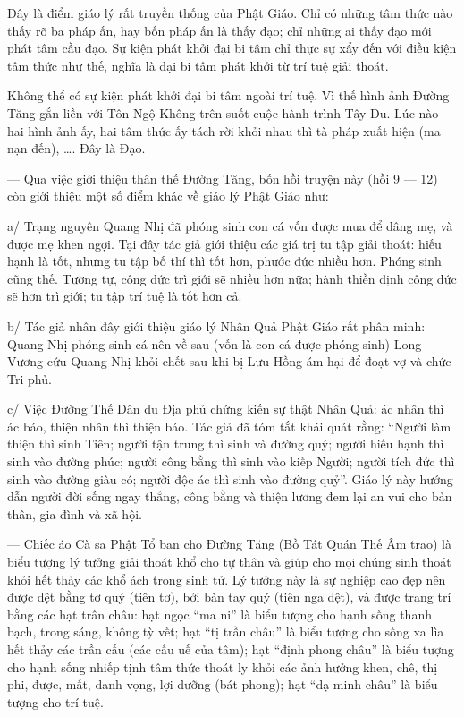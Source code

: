Đây là điểm giáo lý rất truyền thống của Phật Giáo. Chỉ có những tâm thức nào thấy rõ ba pháp ấn, hay bốn pháp ấn là thấy đạo; chỉ những ai thấy đạo mới phát tâm cầu đạo. Sự kiện phát khởi đại bi tâm chỉ thực sự xẩy đến với điều kiện tâm thức như thế, nghĩa là đại bi tâm phát khởi từ trí tuệ giải thoát.

Không thể có sự kiện phát khởi đại bi tâm ngoài trí tuệ. Vì thế hình ảnh Đường Tăng gắn liền với Tôn Ngộ Không trên suốt cuộc hành trình Tây Du. Lúc nào hai hình ảnh ấy, hai tâm thức ấy tách rời khỏi nhau thì tà pháp xuất hiện (ma nạn đến), \ldots. Đây là Đạo.

— Qua việc giới thiệu thân thế Đường Tăng, bốn hồi truyện này (hồi 9 — 12) còn giới thiệu một số điểm khác về giáo lý Phật Giáo như:

a/ Trạng nguyên Quang Nhị đã phóng sinh con cá vốn được mua để dâng mẹ, và được mẹ khen ngợi. Tại đây tác giả giới thiệu các giá trị tu tập giải thoát: hiếu hạnh là tốt, nhưng tu tập bố thí thì tốt hơn, phước đức nhiều hơn. Phóng sinh cũng thế. Tương tự, công đức trì giới sẽ nhiều hơn nữa; hành thiền định công đức sẽ hơn trì giới; tu tập trí tuệ là tốt hơn cả.

b/ Tác giả nhân đây giới thiệu giáo lý Nhân Quả Phật Giáo rất phân minh: Quang Nhị phóng sinh cá nên về sau (vốn là con cá được phóng sinh) Long Vương cứu Quang Nhị khỏi chết sau khi bị Lưu Hồng ám hại để đoạt vợ và chức Tri phủ.

c/ Việc Đường Thế Dân du Địa phủ chứng kiến sự thật Nhân Quả: ác nhân thì ác báo, thiện nhân thì thiện báo. Tác giả đã tóm tắt khái quát rằng: ``Người làm thiện thì sinh Tiên; người tận trung thì sinh và đường quý; người hiếu hạnh thì sinh vào đường phúc; người công bằng thì sinh vào kiếp Người; người tích đức thì sinh vào đường giàu có; người độc ác thì sinh vào đường quỷ''. Giáo lý này hướng dẫn người đời sống ngay thẳng, công bằng và thiện lương đem lại an vui cho bản thân, gia đình và xã hội.

— Chiếc áo Cà sa Phật Tổ ban cho Đường Tăng (Bồ Tát Quán Thế Âm trao) là biểu tượng lý tưởng giải thoát khổ cho tự thân và giúp cho mọi chúng sinh thoát khỏi hết thảy các khổ ách trong sinh tử. Lý tưởng này là sự nghiệp cao đẹp nên được dệt bằng tơ quý (tiên tơ), bởi bàn tay quý (tiên nga dệt), và được trang trí bằng các hạt trân châu: hạt ngọc ``ma ni'' là biểu tượng cho hạnh sống thanh bạch, trong sáng, không tỳ vết; hạt ``tị trần châu'' là biểu tượng cho sống xa lìa hết thảy các trần cấu (các cấu uế của tâm); hạt ``định phong châu'' là biểu tượng cho hạnh sống nhiếp tịnh tâm thức thoát ly khỏi các ảnh hưởng khen, chê, thị phi, được, mất, danh vọng, lợi dưỡng (bát phong); hạt ``dạ minh châu'' là biểu tượng cho trí tuệ.

